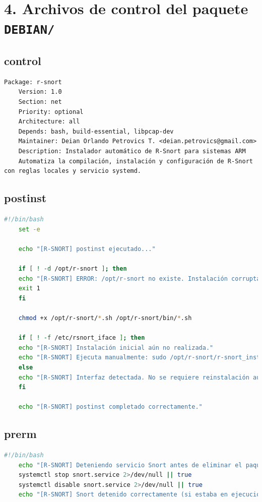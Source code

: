 \documentclass[11pt,a4paper,twoside]{report}
\begin{document}
\section*{4. Archivos de control del paquete \texttt{DEBIAN/}}

\subsection*{control}
\begin{lstlisting}[language={}, caption={Archivo \texttt{lst:control}}, label={lst:control}]
	Package: r-snort
	Version: 1.0
	Section: net
	Priority: optional
	Architecture: all
	Depends: bash, build-essential, libpcap-dev
	Maintainer: Deian Orlando Petrovics T. <deian.petrovics@gmail.com>
	Description: Instalador automático de R-Snort para sistemas ARM
	Automatiza la compilación, instalación y configuración de R-Snort con reglas locales y servicio systemd.
\end{lstlisting}

\subsection*{postinst}
\begin{lstlisting}[language=bash, caption={Script \texttt{postinst}}, label={lst:postinst}]
	#!/bin/bash
	set -e
	
	echo "[R-SNORT] postinst ejecutado..."
	
	if [ ! -d /opt/r-snort ]; then
	echo "[R-SNORT] ERROR: /opt/r-snort no existe. Instalación corrupta."
	exit 1
	fi
	
	chmod +x /opt/r-snort/*.sh /opt/r-snort/bin/*.sh
	
	if [ ! -f /etc/rsnort_iface ]; then
	echo "[R-SNORT] Instalación inicial aún no realizada."
	echo "[R-SNORT] Ejecuta manualmente: sudo /opt/r-snort/r-snort_installer.sh"
	else
	echo "[R-SNORT] Interfaz detectada. No se requiere reinstalación automática."
	fi
	
	echo "[R-SNORT] postinst completado correctamente."
\end{lstlisting}

\pagebreak

\subsection*{prerm}
\begin{lstlisting}[language=bash, caption={Script \texttt{prerm}}, label={lst:prerm}]
	#!/bin/bash
	echo "[R-SNORT] Deteniendo servicio Snort antes de eliminar el paquete..."
	systemctl stop snort.service 2>/dev/null || true
	systemctl disable snort.service 2>/dev/null || true
	echo "[R-SNORT] Snort detenido correctamente (si estaba en ejecución)."
\end{lstlisting}
\end{document}
